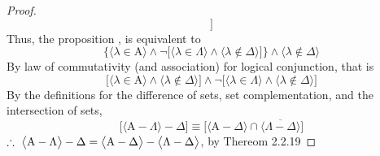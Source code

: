 \documentclass[preview]{standalone}
\begin{document}
\begin{proof}
\begin{equation*}
        \bigg]
    \end{equation*}
    Thus, the proposition
    ,
    is equivalent to
    \begin{equation*}
        \Bigg\{
        \Big \langle \lambda \in \mathrm{A} \Big \rangle
            \land
        \lnot \bigg[
            \Big \langle \lambda \in \Lambda \Big \rangle
                \land
            \Big \langle \lambda \notin \Delta \Big \rangle
        \bigg]
        \Bigg\}
            \land
        \Big \langle \lambda \notin \Delta \Big \rangle
    \end{equation*}
    By law of commutativity (and association) for logical conjunction, 
    that is
    \begin{equation*}
        \bigg[
            \Big \langle \lambda \in \mathrm{A} \Big \rangle
                \land
            \Big \langle \lambda \notin \Delta \Big \rangle
        \bigg]
            \land
        \lnot \bigg[
            \Big \langle \lambda \in \Lambda \Big \rangle
                \land
            \Big \langle \lambda \notin \Delta \Big \rangle
        \bigg]
    \end{equation*}
    By the definitions for the difference of sets, set complementation,
    and the intersection of sets,
    \begin{equation*}
        \bigg[
        \Big \langle \mathrm{A} - \Lambda \Big \rangle - \Delta
        \bigg]
            \equiv
        \bigg[
        \Big \langle \mathrm{A} - \Delta \Big \rangle
            \cap
        \overline{
            \Big \langle \Lambda - \Delta \Big \rangle
        }
        \bigg]
    \end{equation*}
    $\therefore \text{\space} \relax{
    \big \langle \mathrm{A} - \Lambda \big \rangle - \Delta 
        = 
    \big \langle \mathrm{A} - \Delta \big \rangle 
        - 
    \big \langle \Lambda - \Delta \big \rangle
    }$, by Thereom 2.2.19

\color{lightgray} \end{proof}
\end{document}
